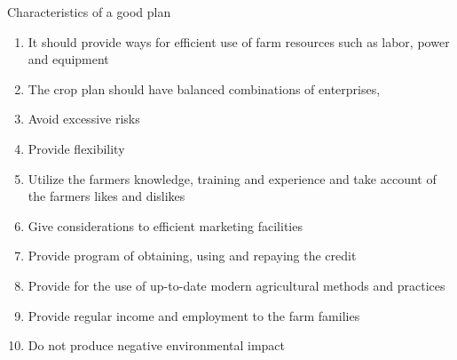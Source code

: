 \documentclass[12pt,ignorenonframetext,aspectratio=169]{beamer}
\providecommand{\tightlist}{%
  \setlength{\itemsep}{0pt}\setlength{\parskip}{0pt}}
\begin{document}
\begin{frame}{Characteristics of a good plan}
\protect\hypertarget{characteristics-of-a-good-plan}{}
\begin{enumerate}
\tightlist
\item
  It should provide ways for efficient use of farm resources such as
  labor, power and equipment
\item
  The crop plan should have balanced combinations of enterprises,
\item
  Avoid excessive risks
\item
  Provide flexibility
\item
  Utilize the farmers knowledge, training and experience and take
  account of the farmers likes and dislikes
\item
  Give considerations to efficient marketing facilities
\item
  Provide program of obtaining, using and repaying the credit
\item
  Provide for the use of up-to-date modern agricultural methods and
  practices
\item
  Provide regular income and employment to the farm families
\item
  Do not produce negative environmental impact
\end{enumerate}
\end{frame}
\end{document}
